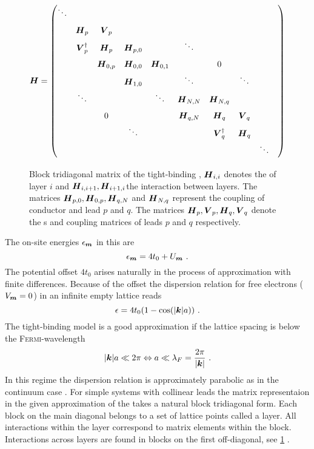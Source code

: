 \begin{figure}[h!]
\centering
\begin{align*}
\mat{H}=
\renewcommand*{\arraystretch}{1.6}
\begin{pmatrix} 
\ddots& & & & & & & & & \\
& \mat{H}_p& \mat{V}_p& & & && &&\\
& \mat{V}^{\dagger}_p& \mat{H}_p& \mat{H}_{p,0}& &\ddots& & &\\
& &\mat{H}_{0,p}&\mat{H}_{0,0} &\mat{H}_{0,1} & &0 & &\\
& & &\mat{H}_{1,0}& &\ddots & &\ddots &\\
& \ddots& & &\ddots &\mat{H}_{N,N} &\mat{H}_{N,q}& & \\
& &0 & & &\mat{H}_{q,N} &\mat{H}_q &\mat{V}_q&\\
& & &\ddots & & &\mat{V}^{\dagger}_q &\mat{H}_q&\\
& & & & & & & &\ddots
\end{pmatrix}
\end{align*}
\caption{Block tridiagonal matrix of the tight-binding \hamil{}, $\boldsymbol{H}_{i,i}$ denotes the \hamil{} of layer $i$ and $\boldsymbol{H}_{i,i+1},\boldsymbol{H}_{i+1,i}$the interaction between layers. The matrices $\boldsymbol{H}_{p,0},\boldsymbol{H}_{0,p},\boldsymbol{H}_{q,N}$ and $\boldsymbol{H}_{N,q}$ represent the coupling of conductor and lead $p$ and $q$. The matrices $\boldsymbol{H}_p,\boldsymbol{V}_p,\boldsymbol{H}_q,\boldsymbol{V}_q$ denote the \hamil s and coupling matrices of leads $p$ and $q$ respectively.}
\label{fig:blocktridiagonal}
\end{figure}
The on-site energies $\epsilon_{\boldsymbol{m}}$ in this \hamil{} are
\begin{equation}
\epsilon_{\boldsymbol{m}} = 4t_0 + U_{\boldsymbol{m}}\ .
\end{equation}
The potential offset $4t_0$ arises naturally in the process of approximation with finite differences. Because of the offset the dispersion relation for free electrons ($V_{\boldsymbol{m}}=0$) in an infinite empty lattice reads
\begin{equation}
\epsilon = 4t_0(1-\text{cos}(\lvert\boldsymbol{k}\rvert a))\ .
\end{equation}
The tight-binding model is a good approximation if the lattice spacing is below the \textsc{Fermi}-wavelength
\begin{equation}
\lvert\boldsymbol{k}\rvert a \ll  2\pi \Leftrightarrow a \ll \lambda_F = \frac{2\pi}{\lvert\boldsymbol{k}\rvert} \ .
\end{equation}
In this regime the dispersion relation is approximately parabolic as in the continuum case \cite{Metalidis2007Thesis}.
For simple systems with collinear leads the matrix representaion in the given approximation of the \hamil{} takes a natural block tridiagonal form. Each block on the main diagonal belongs to a set of lattice points called a layer. All interactions within the layer correspond to matrix elements within the block. Interactions across layers are found in blocks on the first off-diagonal, see \cref{fig:blocktridiagonal} \cite{AnLunNik2008}.
